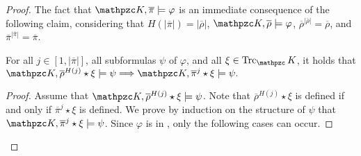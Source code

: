 \begin{proof}
The fact that
$\Ku,\overline{\pi}\models \varphi$ is an immediate consequence of the following claim, considering that  $H(|\overline{\pi}|)=|\overline{\rho}|$, $\Ku,\overline{\rho}\models \varphi$,  $\overline{\rho}^{|\overline{\rho}|}=\overline{\rho}$, and $\overline{\pi}^{|\overline{\pi}|}=\overline{\pi}$.

\begin{claim}\label{claim:Hj} For all $j\in [1,|\overline{\pi}|]$, all subformulas $\psi$ of $\varphi$, and all $\xi\in\Trk_\Ku$, 
it holds that
$
\Ku,\overline{\rho}^{H(j)}\star \xi\models \psi \Longrightarrow \Ku,\overline{\pi}^{j}\star \xi\models \psi.
$
\end{claim}
\begin{proof}
Assume that $\Ku,\overline{\rho}^{H(j)}\star \xi\models \psi $. Note that $\overline{\rho}^{H(j)}\star \xi$ is defined if and only if $\overline{\pi}^{j}\star \xi$ is defined. We prove by induction on the structure of $\psi$  that
$\Ku,\overline{\pi}^{j}\star \xi\models \psi$. Since $\varphi$ is in \nnf, only the following cases can occur.


\end{proof}
\end{proof}
